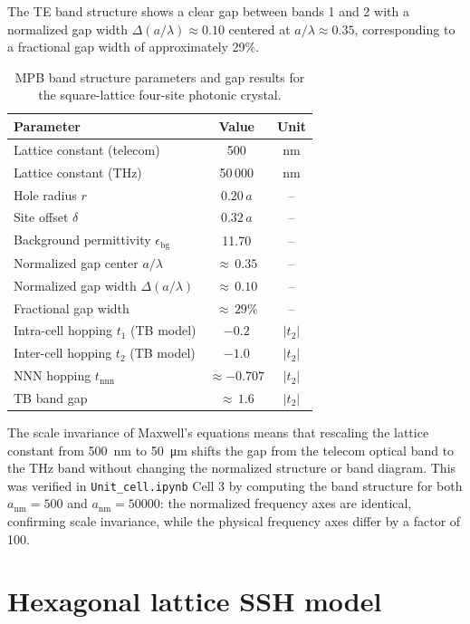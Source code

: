 \documentclass[12pt,a4paper,oneside]{book}
\theoremstyle{plain}
\theoremstyle{definition}
\theoremstyle{remark}
\newcommand{\eps}{\epsilon}
\begin{document}
The TE band structure shows a clear gap between bands 1 and 2 with a normalized gap width $\Delta(a/\lambda) \approx 0.10$ centered at $a/\lambda \approx 0.35$, corresponding to a fractional gap width of approximately 29\%.

\begin{table}[htbp]
  \centering
  \caption{MPB band structure parameters and gap results for the square-lattice four-site photonic crystal.}
  \label{tab:mpb-params}
  \begin{tabular}{lcc}
    \toprule
    Parameter & Value & Unit \\
    \midrule
    Lattice constant (telecom) & 500 & \si{\nano\metre} \\
    Lattice constant (THz) & 50\,000 & \si{\nano\metre} \\
    Hole radius $r$ & $0.20\,a$ & -- \\
    Site offset $\delta$ & $0.32\,a$ & -- \\
    Background permittivity $\eps_\mathrm{bg}$ & 11.70 & -- \\
    Normalized gap center $a/\lambda$ & ${\approx}\,0.35$ & -- \\
    Normalized gap width $\Delta(a/\lambda)$ & ${\approx}\,0.10$ & -- \\
    Fractional gap width & ${\approx}\,29\%$ & -- \\
    Intra-cell hopping $t_1$ (TB model) & $-0.2$ & $|t_2|$ \\
    Inter-cell hopping $t_2$ (TB model) & $-1.0$ & $|t_2|$ \\
    NNN hopping $t_\mathrm{nnn}$ & ${\approx}-0.707$ & $|t_2|$ \\
    TB band gap & ${\approx}\,1.6$ & $|t_2|$ \\
    \bottomrule
  \end{tabular}
\end{table}

The scale invariance of Maxwell's equations means that rescaling the lattice constant from \SI{500}{\nano\metre} to \SI{50}{\micro\metre} shifts the gap from the telecom optical band to the THz band without changing the normalized structure or band diagram. This was verified in \texttt{Unit\_cell.ipynb} Cell 3 by computing the band structure for both $a_\mathrm{nm} = 500$ and $a_\mathrm{nm} = 50000$: the normalized frequency axes are identical, confirming scale invariance, while the physical frequency axes differ by a factor of 100.

\section{Hexagonal lattice SSH model}
\label{sec:hex-lattice}
\end{document}
